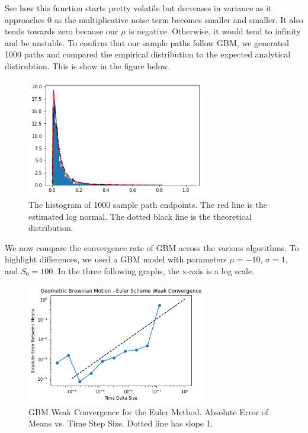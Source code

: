\documentclass[notitlepage,pra,10pt,aps]{revtex4-2}
\begin{document}
  See how this function starts pretty volatile but decreases in variance as it approaches 0 as the multiplicative noise term becomes smaller and smaller. It also tends towards zero because our $\mu$ is negative. Otherwise, it would tend to infinity and be unstable. To confirm that our sample paths follow GBM, we generated 1000 paths and compared the empirical distribution to the expected analytical distirubtion. This is show in the figure below.

  \begin{figure}[H]
    \centering
      \includegraphics[width=0.7\textwidth]{lognormal_gbm.png}
    \caption{The histogram of 1000 sample path endpoints. The red line is the estimated log normal. The dotted black line is the theoretical distribution.}
  \end{figure}

  We now compare the convergence rate of GBM across the various algorithms. To highlight differences, we used a GBM model with parameters $\mu = -10$, $\sigma = 1$, and $S_0 = 100$. In the three following graphs, the x-axis is a log scale.

  \begin{figure}[H]
    \centering
      \includegraphics[width=0.7\textwidth]{gbm_euler.png}
    \caption{GBM Weak Convergence for the Euler Method. Absolute Error of Means vs. Time Step Size. Dotted line has slope 1.}
  \end{figure}
\end{document}
